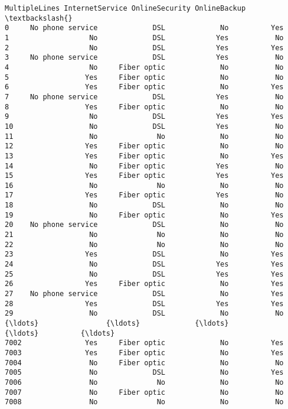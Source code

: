 \documentclass[11pt]{article}
\begin{document}
\begin{tcolorbox}[breakable, boxrule=.5pt, size=fbox, pad at break*=1mm, opacityfill=0]
\begin{Verbatim}[commandchars=\\\{\}]
         MultipleLines InternetService OnlineSecurity OnlineBackup  \textbackslash{}
0     No phone service             DSL             No          Yes
1                   No             DSL            Yes           No
2                   No             DSL            Yes          Yes
3     No phone service             DSL            Yes           No
4                   No     Fiber optic             No           No
5                  Yes     Fiber optic             No           No
6                  Yes     Fiber optic             No          Yes
7     No phone service             DSL            Yes           No
8                  Yes     Fiber optic             No           No
9                   No             DSL            Yes          Yes
10                  No             DSL            Yes           No
11                  No              No             No           No
12                 Yes     Fiber optic             No           No
13                 Yes     Fiber optic             No          Yes
14                  No     Fiber optic            Yes           No
15                 Yes     Fiber optic            Yes          Yes
16                  No              No             No           No
17                 Yes     Fiber optic            Yes           No
18                  No             DSL             No           No
19                  No     Fiber optic             No          Yes
20    No phone service             DSL             No           No
21                  No              No             No           No
22                  No              No             No           No
23                 Yes             DSL             No          Yes
24                  No             DSL            Yes          Yes
25                  No             DSL            Yes          Yes
26                 Yes     Fiber optic             No          Yes
27    No phone service             DSL             No          Yes
28                 Yes             DSL            Yes          Yes
29                  No             DSL             No           No
{\ldots}                {\ldots}             {\ldots}            {\ldots}          {\ldots}
7002               Yes     Fiber optic             No          Yes
7003               Yes     Fiber optic             No          Yes
7004                No     Fiber optic             No           No
7005                No             DSL             No          Yes
7006                No              No             No           No
7007                No     Fiber optic             No           No
7008                No              No             No           No

\end{Verbatim}
\end{tcolorbox}
\end{document}
